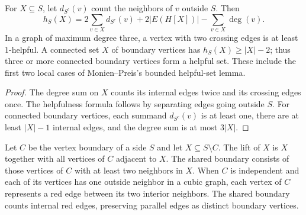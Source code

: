 \begin{theorem}
  \label{thm:lowerbounds-algebraic-local-helpful}
  \leanok
  For $X\subseteq S$, let $d_{S^c}(v)$ count the neighbors of $v$ outside
  $S$. Then
  \[
    h_S(X)=2\sum_{v\in X}d_{S^c}(v)+2|E(H[X])|-\sum_{v\in X}\deg(v).
  \]
  In a graph of maximum degree three, a vertex with two crossing edges
  is at least $1$-helpful. A connected set $X$ of boundary vertices has
  $h_S(X)\ge |X|-2$; thus three or more connected boundary vertices
  form a helpful set. These include the first two local cases of
  Monien--Preis's bounded helpful-set lemma.
\end{theorem}
\begin{proof}
  \leanok
  The degree sum on $X$ counts its internal edges twice and its crossing
  edges once. The helpfulness formula follows by separating edges going
  outside $S$. For connected boundary vertices, each summand
  $d_{S^c}(v)$ is at least one, there are at least $|X|-1$ internal
  edges, and the degree sum is at most $3|X|$.
\end{proof}

\begin{definition}
  \label{def:lowerbounds-algebraic-boundary-lift}
  \leanok
  Let $C$ be the vertex boundary of a side $S$ and let $X\subseteq S\setminus C$.
  The lift of $X$ is $X$ together with all vertices of $C$ adjacent to $X$.
  The shared boundary consists of those vertices of $C$ with at least two
  neighbors in $X$. When $C$ is independent and each of its vertices has
  one outside neighbor in a cubic graph, each vertex of $C$ represents a
  red edge between its two interior neighbors. The shared boundary counts
  internal red edges, preserving parallel edges as distinct boundary vertices.
\end{definition}

